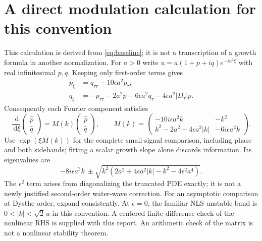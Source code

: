 \documentclass[11pt]{article}
\newcommand{\D}{\lvert D_\tau\rvert}
\newcommand{\dd}{\,\mathrm d}
\begin{document}
\section{A direct modulation calculation for this convention}
\label{app:mi}
This calculation is derived from \eqref{eq:baseline}; it is not a
transcription of a growth formula in another normalization.
For $a>0$ write
$u=a(1+p+iq)e^{-ia^2\xi}$ with real infinitesimal $p,q$.
Keeping only first-order terms gives
\begin{align*}
p_\xi&=q_{\tau\tau}-10\epsilon a^2p_\tau,\\
q_\xi&=-p_{\tau\tau}-2a^2p
       -6\epsilon a^2q_\tau-4\epsilon a^2\D p.
\end{align*}
Consequently each Fourier component satisfies
\begin{equation}
\frac{\dd}{\dd\xi}
\begin{pmatrix}\widehat p\\\widehat q\end{pmatrix}
=M(k)\begin{pmatrix}\widehat p\\\widehat q\end{pmatrix},
\qquad
M(k)=
\begin{pmatrix}
-10i\epsilon a^2k & -k^2\\
k^2-2a^2-4\epsilon a^2|k| & -6i\epsilon a^2k
\end{pmatrix}.
\label{eq:mi}
\end{equation}
Use $\exp(\xi M(k))$ for the complete small-signal comparison, including
phase and both sidebands; fitting a scalar growth slope alone discards
information. Its eigenvalues are
\[
-8i\epsilon a^2k
\ \pm\sqrt{k^2\left(2a^2+4\epsilon a^2|k|-k^2
                            -4\epsilon^2a^4\right)}.
\]
The $\epsilon^2$ term arises from diagonalizing the truncated PDE
exactly; it is not a newly justified second-order water-wave correction.
For an asymptotic comparison at Dysthe order, expand consistently.
At $\epsilon=0$, the familiar NLS unstable band is
$0<|k|<\sqrt2\,a$ in this convention.
A centered finite-difference check of the nonlinear RHS is supplied
with this report. An arithmetic check of the matrix is not a
nonlinear stability theorem.


\end{document}
